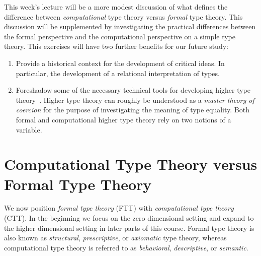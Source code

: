 \documentclass{article}
\begin{document}
This week's lecture will be a more modest discussion of what defines
the difference between \emph{computational} type theory versus
\emph{formal} type theory. This discussion will be supplemented by
investigating the practical differences between the formal perspective
and the computational perspective on a simple type theory. This
exercises will have two further benefits for our future study:
\begin{enumerate}
\item Provide a historical context for the development of critical
  ideas. In particular, the development of a relational interpretation
  of types.
\item Foreshadow some of the necessary technical tools for developing
  higher type theory~\citep{Angiuli:chtt:17}. Higher type theory can roughly
  be understood as a \emph{master theory of coercion} for the purpose of investigating the
  meaning of type equality.  Both formal and computational higher type theory rely on
  two notions of a variable.
\end{enumerate}

\section{Computational Type Theory versus Formal Type Theory}
We now position \emph{formal type theory} (FTT) with \emph{computational type theory} (CTT).
In the beginning we focus on the zero dimensional setting and expand to the higher dimensional
setting in later parts of this course.  Formal type theory is also known as \emph{structural},
\emph{prescriptive}, or \emph{axiomatic} type theory, whereas computational type theory is
referred to as \emph{behavioral}, \emph{descriptive}, or \emph{semantic}.
\end{document}
